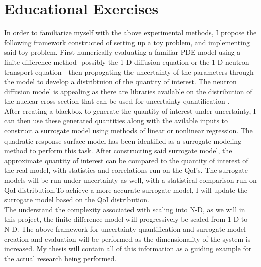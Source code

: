 \documentclass{article}
\begin{document}
\section{Educational Exercises}
In order to familiarize myself with the above experimental methods, I propose the following framework constructed of setting up a toy problem, and implementing said toy problem. First numerically evaluating a familiar PDE model using a finite difference method-  possibly the 1-D diffusion equation or the 1-D neutron transport equation - then propogating the uncertainty of the parameters through the model to develop a distribtuion of the quantity of interest. The neutron diffusion model is appealing as there are libraries available on the distribution of the nuclear cross-section that can be used for uncertainty quantification \cite{Smith}.\\
After creating a blackbox to generate the quantity of interest under uncertainty, I can then use these generated quantities along with the avilable inputs to construct a surrogate model using methods of linear or nonlinear regression. The quadratic response surface model has been identified as a surrogate modeling method to perform this task. After constructing said surrogate model, the approximate quantity of interest can be compared to the quantity of interest of the real model, with statistics and correlations run on the QoI's. The surrogate models will be run under uncertainty as well, with a statistical comparison run on QoI distribution.To achieve a more accurate surrogate model, I will update the surrogate model based on the QoI distribution.\\
The understand the complexity associated with scaling into N-D, as we will in this project, the finite difference model will progressively be scaled from 1-D to N-D. The above framework for uncertainty quantification and surrogate model creation and evaluation will be performed as the dimensionality of the system is increased. My thesis will contain all of this information as a guiding example for the actual research being performed.\\


%
\end{document}
